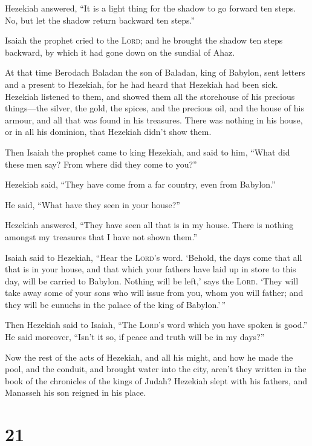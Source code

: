  Hezekiah answered, ``It is a light thing for the shadow
to go forward ten steps. No, but let the shadow return backward ten
steps.''

 Isaiah the prophet cried to the \textsc{Lord}; and he
brought the shadow ten steps backward, by which it had gone down on the
sundial of Ahaz.

 At that time Berodach Baladan the son of Baladan, king
of Babylon, sent letters and a present to Hezekiah, for he had heard
that Hezekiah had been sick.  Hezekiah listened to them,
and showed them all the storehouse of his precious things---the silver,
the gold, the spices, and the precious oil, and the house of his armour,
and all that was found in his treasures. There was nothing in his house,
or in all his dominion, that Hezekiah didn't show them.

 Then Isaiah the prophet came to king Hezekiah, and said
to him, ``What did these men say? From where did they come to you?''

Hezekiah said, ``They have come from a far country, even from Babylon.''

 He said, ``What have they seen in your house?''

Hezekiah answered, ``They have seen all that is in my house. There is
nothing amongst my treasures that I have not shown them.''

 Isaiah said to Hezekiah, ``Hear the \textsc{Lord}'s
word.  `Behold, the days come that all that is in your
house, and that which your fathers have laid up in store to this day,
will be carried to Babylon. Nothing will be left,' says the
\textsc{Lord}.  `They will take away some of your sons
who will issue from you, whom you will father; and they will be eunuchs
in the palace of the king of Babylon.'\,''

 Then Hezekiah said to Isaiah, ``The \textsc{Lord}'s word
which you have spoken is good.'' He said moreover, ``Isn't it so, if
peace and truth will be in my days?''

 Now the rest of the acts of Hezekiah, and all his might,
and how he made the pool, and the conduit, and brought water into the
city, aren't they written in the book of the chronicles of the kings of
Judah?  Hezekiah slept with his fathers, and Manasseh his
son reigned in his place.

\hypertarget{section-20}{%
\section{21}\label{section-20}}

